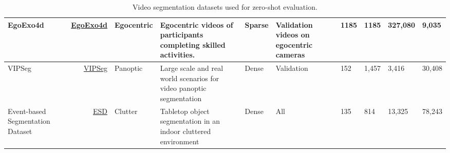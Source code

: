 \documentclass[]{fairmeta}
\begin{document}
\begin{table}[!ht]
{\begin{tabular}{L{3.5cm} r | l | L{7cm}| l | L{3.2cm} | l l l l}
\hline
EgoExo4d~\citep{grauman2023ego} &
\href{https://ego-exo4d-data.org/}{EgoExo4d} &
Egocentric &
Egocentric videos of participants completing skilled activities. &
Sparse &
Validation videos on egocentric cameras & 1185 & 1185 & 327,080 &  9,035 \\ \hline
VIPSeg~\citep{miao2022large} &
\href{https://github.com/vipseg-dataset/vipseg-dataset}{VIPSeg} &
Panoptic &
Large scale and real world scenarios for video panoptic segmentation &
Dense & Validation & 152 & 1,457 & 3,416 &  30,408 \\ \hline
Event-based Segmentation Dataset~\citep{huang2023neuromorphic} &
\href{https://figshare.com/s/94e5607718545aeb9a4e}{ESD} &
Clutter & Tabletop object segmentation in an indoor cluttered environment & Dense & All & 135 & 814 & 13,325 &  78,243 \\
\end{tabular}}
\caption{Video segmentation datasets used for zero-shot evaluation.}
\label{app:tab:datasets_all}
\end{table}
\end{document}
